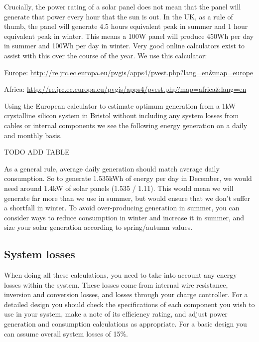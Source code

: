 \documentclass{article}
\theoremstyle{definition}
\theoremstyle{definition}
\theoremstyle{remark}
\begin{document}
    Crucially, the power rating of a solar panel does not mean that the panel will generate that power every hour that the sun is out. In the UK, as a rule of thumb, the panel will generate 4.5 hours equivalent peak in summer and 1 hour equivalent peak in winter. This means a 100W panel will produce 450Wh per day in summer and 100Wh per day in winter. Very good online calculators exist to assist with this over the course of the year. We use this calculator:

    Europe: \href{http://re.jrc.ec.europa.eu/pvgis/apps4/pvest.php?lang=en\&map=europe}{http://re.jrc.ec.europa.eu/pvgis/apps4/pvest.php?lang=en\&map=europe}

    Africa: \href{http://re.jrc.ec.europa.eu/pvgis/apps4/pvest.php?map=africa\&lang=en}{http://re.jrc.ec.europa.eu/pvgis/apps4/pvest.php?map=africa\&lang=en}

    Using the European calculator to estimate optimum generation from a 1kW crystalline silicon system in Bristol without including any system losses from cables or internal components we see the following energy generation on a daily and monthly basis.

    TODO ADD TABLE

    As a general rule, average daily generation should match average daily consumption. So to generate 1.535kWh of energy per day in December, we would need around 1.4kW of solar panels (1.535 / 1.11). This would mean we will generate far more than we use in summer, but would ensure that we don’t suffer a shortfall in winter. To avoid over-producing generation in summer, you can consider ways to reduce consumption in winter and increase it in summer, and size your solar generation according to spring/autumn values.
  

  \subsection{System losses} %
  \label{sub:system_losses}

    When doing all these calculations, you need to take into account any energy losses within the system. These losses come from internal wire resistance, inversion and conversion losses, and losses through your charge controller. For a detailed design you should check the specifications of each component you wish to use in your system, make a note of its efficiency rating, and adjust power generation and consumption calculations as appropriate. For a basic design you can assume overall system losses of 15\%.
\end{document}
